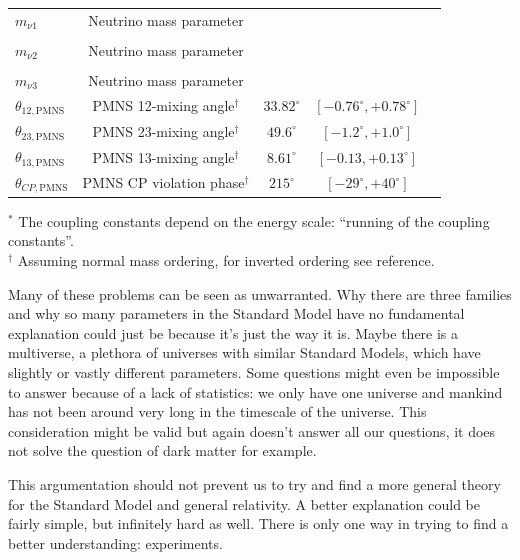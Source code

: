 \begin{table}[]
{\begin{tabular}{|l|c|c|c|c|}
\multirow{-2}{*}{$m_{\nu1}$} &\multirow{-2}{*}{Neutrino mass parameter}&&&\\
 &     &       & & \\
\multirow{-2}{*}{$m_{\nu2}$} &\multirow{-2}{*}{Neutrino mass parameter}&&&\\ 
 &   &       & & \\ 
\multirow{-2}{*}{$m_{\nu3}$} &\multirow{-2}{*}{Neutrino mass parameter}&&&\\
\hline
$\theta_{12,\textrm{PMNS}}$  &  PMNS 12-mixing angle$^\dagger$ & $33.82^{\circ}$ & $\left[-0.76^\circ, +0.78^\circ \right]$ & \cite{Esteban:2016qun,nufit2018}\\ \hline
$\theta_{23,\textrm{PMNS}}$  &  PMNS 23-mixing angle$^\dagger$ &
$49.6^{\circ}$ & $\left[-1.2^\circ, +1.0^\circ\right]$ & \cite{Esteban:2016qun,nufit2018}\\ \hline 
$\theta_{13,\textrm{PMNS}}$  &  PMNS 13-mixing angle$^\dagger$ &$8.61^{\circ}$ & $\left[-0.13,+0.13^\circ\right]$ & \cite{Esteban:2016qun,nufit2018}\\ \hline
$\theta_{CP,\textrm{PMNS}}$  &  PMNS CP violation phase$^\dagger$ &  $215^{\circ}$ & $\left[-29^\circ,+40^\circ \right]$ & \cite{Esteban:2016qun,nufit2018} \\ \hline
\end{tabular}%
}
$^*$ The coupling constants depend on the energy scale: ``running of the coupling constants''.\\
$^\dagger $ Assuming normal mass ordering, for inverted ordering see reference.
\end{table}
\vspace{2mm}


\noindent Many of these problems can be seen as unwarranted. Why there are three families and why so many parameters in the Standard Model have no fundamental explanation could just be because it's just the way it is. Maybe there is a multiverse, a plethora of universes with similar Standard Models, which have slightly or vastly different parameters. Some questions might even be impossible to answer because of a lack of statistics: we only have one universe and mankind has not been around very long in the timescale of the universe. This consideration might be valid but again doesn't answer all our questions, it does not solve the question of dark matter for example.

This argumentation should not prevent us to try and find a more general theory for the Standard Model and general relativity. A better explanation could be fairly simple, but infinitely hard as well. There is only one way in trying to find a better understanding: experiments.

